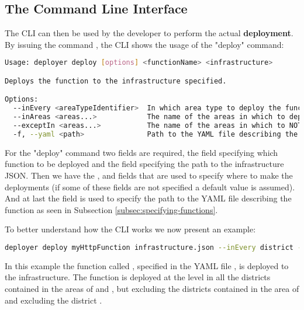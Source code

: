 \subsection{The Command Line Interface}
The CLI can then be used by the developer to perform the actual \textbf{deployment}.
By issuing the command , the CLI shows the usage of the "deploy" command:

\begin{lstlisting}[language=bash]
Usage: deployer deploy [options] <functionName> <infrastructure>

Deploys the function to the infrastructure specified.

Options:
  --inEvery <areaTypeIdentifier>  In which area type to deploy the function. If not specified the function is deployed to the lowest level.
  --inAreas <areas...>            The name of the areas in which to deploy the function. If not specified the function is deployed everywhere.
  --exceptIn <areas...>           The name of the areas in which to NOT deploy the function.
  -f, --yaml <path>               Path to the YAML file describing the function. (default: "stack.yml")
\end{lstlisting}

For the "deploy" command two fields are required, the  field specifying which function to be deployed and the  field specifying the path to the infrastructure JSON.
Then we have the ,  and  fields that are used to specify where to make the deployments (if some of these fields are not specified a default value is assumed).
And at last the  field is used to specify the path to the YAML file describing the function as seen in Subsection \ref{subsec:specifying-functions}.

To better understand how the CLI works we now present an example:

\begin{lstlisting}[language=bash]
deployer deploy myHttpFunction infrastructure.json --inEvery district --inAreas italy paris --exceptIn milan paris001 --yaml stack.yml
\end{lstlisting}

In this example the function called , specified in the YAML file , is deployed to the infrastructure. The function is deployed at the  level in all the districts contained in the areas of  and , but excluding the districts contained in the area of  and excluding the district .

